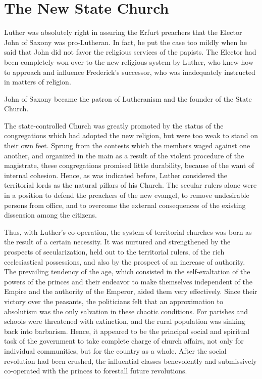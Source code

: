 \section{The New State Church}

Luther was absolutely right in assuring the Erfurt preachers that
the Elector John of Saxony was pro-Lutheran. In fact, he put the
case too mildly when he said that John did not favor the religious
services of the papists. The Elector had been completely won over
to the new religious system by Luther, who knew how to approach
and influence Frederick’s successor, who was inadequately instructed
in matters of religion.

John of Saxony became the patron of Lutheranism and the founder
of the State Church.

The state-controlled Church was greatly promoted by the status
of the congregations which had adopted the new religion, but were
too weak to stand on their own feet. Sprung from the contests
which the members waged against one another, and organized in
the main as a result of the violent procedure of the magistrate, these
congregations promised little durability, because of the want of internal
cohesion. Hence, as was indicated before, Luther considered
the territorial lords as the natural pillars of his Church. The secular
rulers alone were in a position to defend the preachers of the new
evangel, to remove undesirable persons from office, and to overcome
the external consequences of the existing dissension among the
citizens.

Thus, with Luther’s co-operation, the system of territorial churches
was born as the result of a certain necessity. It was nurtured and
strengthened by the prospects of secularization, held out to the territorial
rulers, of the rich ecclesiastical possessions, and also by the
prospect of an increase of authority. The prevailing tendency of
the age, which consisted in the self-exaltation of the powers of
the princes and their endeavor to make themselves independent of
the Empire and the authority of the Emperor, aided them very
effectively. Since their victory over the peasants, the politicians felt
that an approximation to absolutism was the only salvation in
these chaotic conditions. For parishes and schools were threatened
with extinction, and the rural population was sinking back into
barbarism. Hence, it appeared to be the principal social and spiritual
task of the government to take complete charge of church affairs,
not only for individual communities, but for the country as a whole.
After the social revolution had been crushed, the influential classes
benevolently and submissively co-operated with the princes to forestall
future revolutions.

